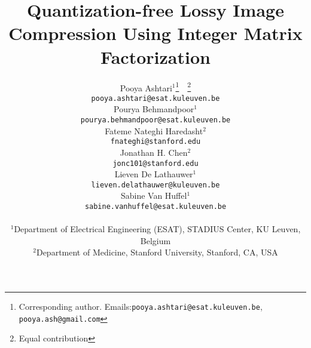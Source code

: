 \documentclass{article}
\title{Quantization-free Lossy Image Compression Using Integer Matrix Factorization}
\author{%
Pooya Ashtari$^{1}$\thanks{Corresponding author. Emails:\texttt{pooya.ashtari@esat.kuleuven.be}, \texttt{pooya.ash@gmail.com}}\ \ \thanks{Equal contribution} \\
\texttt{pooya.ashtari@esat.kuleuven.be} \\
\And
Pourya Behmandpoor$^{1}$\footnotemark[2] \\
\texttt{pourya.behmandpoor@esat.kuleuven.be} \\
\And
Fateme Nateghi Haredasht$^{2}$ \\
\texttt{fnateghi@stanford.edu} \\
\And
Jonathan H. Chen$^{2}$ \\
\texttt{jonc101@stanford.edu} \\
\And
Lieven De Lathauwer$^{1}$ \\
\texttt{lieven.delathauwer@kuleuven.be} \\
\And
Sabine Van Huffel$^{1}$ \\
\texttt{sabine.vanhuffel@esat.kuleuven.be} \\
\And
\vspace{-15pt} \\
$^{1}$Department of Electrical Engineering (ESAT), STADIUS Center, KU Leuven, Belgium \\
$^{2}$Department of Medicine, Stanford University, Stanford, CA, USA \\
}
\begin{document}
\maketitle

















\medskip

{
\small


}



\appendix




\end{document}
